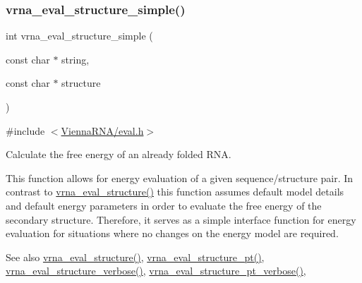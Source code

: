\subsubsection{\texorpdfstring{vrna\_eval\_structure\_simple()}{vrna\_eval\_structure\_simple()}}
{\footnotesize\ttfamily int vrna\+\_\+eval\+\_\+structure\+\_\+simple (\begin{DoxyParamCaption}\item[{const char $\ast$}]{string,  }\item[{const char $\ast$}]{structure }\end{DoxyParamCaption})}



{\ttfamily \#include $<$\mbox{\hyperlink{eval_8h}{Vienna\+R\+N\+A/eval.\+h}}$>$}



Calculate the free energy of an already folded R\+NA. 

This function allows for energy evaluation of a given sequence/structure pair. In contrast to \mbox{\hyperlink{group__eval_ga58f199f1438d794a265f3b27fc8ea631}{vrna\+\_\+eval\+\_\+structure()}} this function assumes default model details and default energy parameters in order to evaluate the free energy of the secondary structure. Therefore, it serves as a simple interface function for energy evaluation for situations where no changes on the energy model are required.

\begin{DoxySeeAlso}{See also}
\mbox{\hyperlink{group__eval_ga58f199f1438d794a265f3b27fc8ea631}{vrna\+\_\+eval\+\_\+structure()}}, \mbox{\hyperlink{group__eval_gadbd09372ddfd7a450bbd590c96a6bfe4}{vrna\+\_\+eval\+\_\+structure\+\_\+pt()}}, \mbox{\hyperlink{group__eval_ga0928d699d310178f84ee2351034e5cb5}{vrna\+\_\+eval\+\_\+structure\+\_\+verbose()}}, \mbox{\hyperlink{group__eval_ga8a517cfeeae8c376ae7b1e0c401d38b4}{vrna\+\_\+eval\+\_\+structure\+\_\+pt\+\_\+verbose()}},
\end{DoxySeeAlso}


